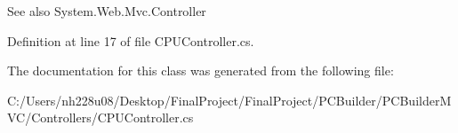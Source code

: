 \begin{DoxySeeAlso}{See also}
System.\+Web.\+Mvc.\+Controller


\end{DoxySeeAlso}


Definition at line 17 of file C\+P\+U\+Controller.\+cs.



The documentation for this class was generated from the following file\+:\begin{DoxyCompactItemize}
\item 
C\+:/\+Users/nh228u08/\+Desktop/\+Final\+Project/\+Final\+Project/\+P\+C\+Builder/\+P\+C\+Builder\+M\+V\+C/\+Controllers/C\+P\+U\+Controller.\+cs\end{DoxyCompactItemize}
